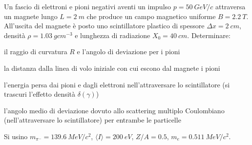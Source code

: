 \begin{Exercise}[title={Spettrometro magnetico, perdite di energia, multiplo scattering}]
  Un fascio di elettroni e pioni negativi aventi un impulso
  $p=\SI{50}{GeV/c}$ attraversa un magnete lungo $L=\SI{2}{m}$ che
  produce un campo magnetico uniforme $B =\SI{2.2}{T}$. All’uscita del
  magnete \`e posto uno scintillatore plastico di spessore $\Delta
  x=\SI{2}{cm}$, densit\`a $\rho = \SI{1.03}{gcm^{-3}}$ e lunghezza di
  radiazione $X_0=\SI{40}{cm}$. Determinare:

  \Question il raggio di curvatura $R$ e l’angolo di deviazione per i pioni

  \Question la distanza dalla linea di volo iniziale  con cui escono dal magnete i pioni

  \Question l’energia persa dai pioni e dagli elettroni nell’attraversare lo scintillatore (si trascuri
  l’effetto densit\`a $\delta(\gamma)$)

  \Question l’angolo medio di deviazione dovuto allo scattering multiplo Coulombiano (nell’attraversare lo
  scintillatore) per entrambe le particelle

  Si usino $m_{\pi^-}=\SI{139.6}{MeV/c^2}$, $\langle I \rangle = \SI{200}{eV}$, $Z/A=0.5$, $m_e=\SI{0.511}{MeV/c^2}$.

\end{Exercise}
